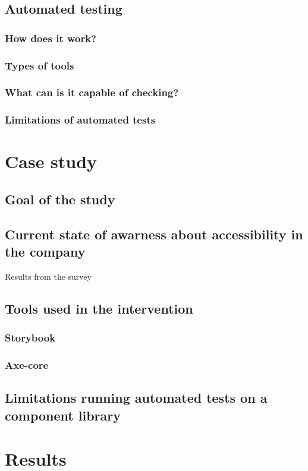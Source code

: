 \documentclass{master_thesis}
\begin{document}
\subsection{Automated testing}
% 
\subsubsection{How does it work?}
\subsubsection{Types of tools}
\subsubsection{What can is it capable of checking?}
\subsubsection{Limitations of automated tests}

\section{Case study}
% 
\subsection{Goal of the study}
\subsection{Current state of awarness about accessibility in the company}
Results from the survey
\subsection{Tools used in the intervention}
\subsubsection{Storybook}
\subsubsection{Axe-core}
\subsection{Limitations running automated tests on a component library}

\section{Results}
\end{document}
